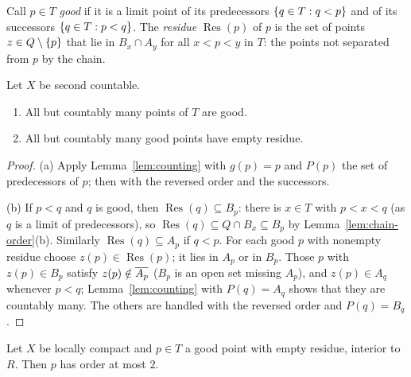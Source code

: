 
Call $p\in T$ \emph{good} if it is a limit point of its predecessors $\left\{ q\in T:q<p \right\}$ and of its successors $\left\{ q\in T:p<q \right\}$. The
\emph{residue} $\operatorname{Res}(p)$ of $p$ is the set of points $z\in Q\setminus\left\{ p \right\}$ that lie in $B_x\cap A_y$ for all $x<p<y$ in $T$: the points not
separated from $p$ by the chain.


\begin{lemma}\label{lem:good-res}
Let $X$ be second countable.
\begin{enumerate}[label=(\alph*)]
\item All but countably many points of $T$ are good.
\item All but countably many good points have empty residue.
\end{enumerate}
\end{lemma}

\begin{proof}
(a) Apply Lemma~\ref{lem:counting} with $g(p)=p$ and $P(p)$ the set of predecessors of $p$; then with the reversed order and the successors.

(b) If $p<q$ and $q$ is good, then $\operatorname{Res}(q)\subseteq B_p$: there is $x\in T$ with $p<x<q$ (as $q$ is a limit of predecessors), so $\operatorname{Res}(q)\subseteq
Q\cap B_x\subseteq B_p$ by Lemma~\ref{lem:chain-order}(b). Similarly $\operatorname{Res}(q)\subseteq A_p$ if $q<p$. For each good $p$ with nonempty residue choose
$z(p)\in\operatorname{Res}(p)$; it lies in $A_p$ or in $B_p$. Those $p$ with $z(p)\in B_p$ satisfy $z(p)\notin\overline{A_p}$ ($B_p$ is an open set missing $A_p$), and
$z(p)\in A_q$ whenever $p<q$; Lemma~\ref{lem:counting} with $P(q)=A_q$ shows that they are countably many. The others are handled with the reversed order and
$P(q)=B_q$.
\end{proof}


\begin{proposition}\label{prop:good-order2}
Let $X$ be locally compact and $p\in T$ a good point with empty residue, interior to $R$. Then $p$ has order at most $2$.
\end{proposition}

